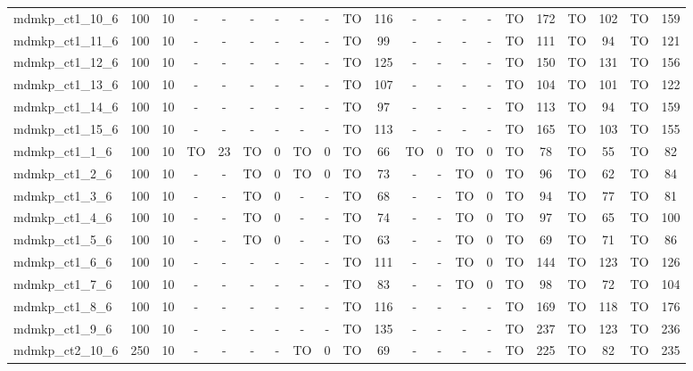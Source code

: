 \begin{sidewaystable}[!ht]
{\begin{tabular}{lcccccccccccccccccccc}
mdmkp\_ct1\_10\_6 & 100 & 10 &  - &  - &  - &  - &  - &  - & TO & 116 &  - &  - &  - &  - & TO & 172 & TO & 102 & TO & 159 \\
mdmkp\_ct1\_11\_6 & 100 & 10 &  - &  - &  - &  - &  - &  - & TO & 99 &  - &  - &  - &  - & TO & 111 & TO & 94 & TO & 121 \\
mdmkp\_ct1\_12\_6 & 100 & 10 &  - &  - &  - &  - &  - &  - & TO & 125 &  - &  - &  - &  - & TO & 150 & TO & 131 & TO & 156 \\
mdmkp\_ct1\_13\_6 & 100 & 10 &  - &  - &  - &  - &  - &  - & TO & 107 &  - &  - &  - &  - & TO & 104 & TO & 101 & TO & 122 \\
mdmkp\_ct1\_14\_6 & 100 & 10 &  - &  - &  - &  - &  - &  - & TO & 97 &  - &  - &  - &  - & TO & 113 & TO & 94 & TO & 159 \\
mdmkp\_ct1\_15\_6 & 100 & 10 &  - &  - &  - &  - &  - &  - & TO & 113 &  - &  - &  - &  - & TO & 165 & TO & 103 & TO & 155 \\
mdmkp\_ct1\_1\_6 & 100 & 10 & TO & 23 & TO & 0 & TO & 0 & TO & 66 & TO & 0 & TO & 0 & TO & 78 & TO & 55 & TO & 82 \\
mdmkp\_ct1\_2\_6 & 100 & 10 &  - &  - & TO & 0 & TO & 0 & TO & 73 &  - &  - & TO & 0 & TO & 96 & TO & 62 & TO & 84 \\
mdmkp\_ct1\_3\_6 & 100 & 10 &  - &  - & TO & 0 &  - &  - & TO & 68 &  - &  - & TO & 0 & TO & 94 & TO & 77 & TO & 81 \\
mdmkp\_ct1\_4\_6 & 100 & 10 &  - &  - & TO & 0 &  - &  - & TO & 74 &  - &  - & TO & 0 & TO & 97 & TO & 65 & TO & 100 \\
mdmkp\_ct1\_5\_6 & 100 & 10 &  - &  - & TO & 0 &  - &  - & TO & 63 &  - &  - & TO & 0 & TO & 69 & TO & 71 & TO & 86 \\
mdmkp\_ct1\_6\_6 & 100 & 10 &  - &  - &  - &  - &  - &  - & TO & 111 &  - &  - & TO & 0 & TO & 144 & TO & 123 & TO & 126 \\
mdmkp\_ct1\_7\_6 & 100 & 10 &  - &  - &  - &  - &  - &  - & TO & 83 &  - &  - & TO & 0 & TO & 98 & TO & 72 & TO & 104 \\
mdmkp\_ct1\_8\_6 & 100 & 10 &  - &  - &  - &  - &  - &  - & TO & 116 &  - &  - &  - &  - & TO & 169 & TO & 118 & TO & 176 \\
mdmkp\_ct1\_9\_6 & 100 & 10 &  - &  - &  - &  - &  - &  - & TO & 135 &  - &  - &  - &  - & TO & 237 & TO & 123 & TO & 236 \\
mdmkp\_ct2\_10\_6 & 250 & 10 &  - &  - &  - &  - & TO & 0 & TO & 69 &  - &  - &  - &  - & TO & 225 & TO & 82 & TO & 235 \\

\end{tabular}}
\end{sidewaystable}
